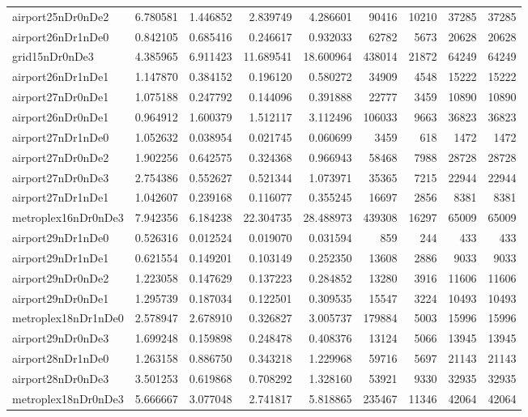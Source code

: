 \begin{longtable}{|l|r|r|r|r|r|r|r|r|}
airport25nDr0nDe2 & 6.780581 & 1.446852 & 2.839749 & 4.286601 & 90416 & 10210 & 37285 & 37285 \\
airport26nDr1nDe0 & 0.842105 & 0.685416 & 0.246617 & 0.932033 & 62782 & 5673 & 20628 & 20628 \\
grid15nDr0nDe3 & 4.385965 & 6.911423 & 11.689541 & 18.600964 & 438014 & 21872 & 64249 & 64249 \\
airport26nDr1nDe1 & 1.147870 & 0.384152 & 0.196120 & 0.580272 & 34909 & 4548 & 15222 & 15222 \\
airport27nDr0nDe1 & 1.075188 & 0.247792 & 0.144096 & 0.391888 & 22777 & 3459 & 10890 & 10890 \\
airport26nDr0nDe1 & 0.964912 & 1.600379 & 1.512117 & 3.112496 & 106033 & 9663 & 36823 & 36823 \\
airport27nDr1nDe0 & 1.052632 & 0.038954 & 0.021745 & 0.060699 & 3459 & 618 & 1472 & 1472 \\
airport27nDr0nDe2 & 1.902256 & 0.642575 & 0.324368 & 0.966943 & 58468 & 7988 & 28728 & 28728 \\
airport27nDr0nDe3 & 2.754386 & 0.552627 & 0.521344 & 1.073971 & 35365 & 7215 & 22944 & 22944 \\
airport27nDr1nDe1 & 1.042607 & 0.239168 & 0.116077 & 0.355245 & 16697 & 2856 & 8381 & 8381 \\
metroplex16nDr0nDe3 & 7.942356 & 6.184238 & 22.304735 & 28.488973 & 439308 & 16297 & 65009 & 65009 \\
airport29nDr1nDe0 & 0.526316 & 0.012524 & 0.019070 & 0.031594 & 859 & 244 & 433 & 433 \\
airport29nDr1nDe1 & 0.621554 & 0.149201 & 0.103149 & 0.252350 & 13608 & 2886 & 9033 & 9033 \\
airport29nDr0nDe2 & 1.223058 & 0.147629 & 0.137223 & 0.284852 & 13280 & 3916 & 11606 & 11606 \\
airport29nDr0nDe1 & 1.295739 & 0.187034 & 0.122501 & 0.309535 & 15547 & 3224 & 10493 & 10493 \\
metroplex18nDr1nDe0 & 2.578947 & 2.678910 & 0.326827 & 3.005737 & 179884 & 5003 & 15996 & 15996 \\
airport29nDr0nDe3 & 1.699248 & 0.159898 & 0.248478 & 0.408376 & 13124 & 5066 & 13945 & 13945 \\
airport28nDr1nDe0 & 1.263158 & 0.886750 & 0.343218 & 1.229968 & 59716 & 5697 & 21143 & 21143 \\
airport28nDr0nDe3 & 3.501253 & 0.619868 & 0.708292 & 1.328160 & 53921 & 9330 & 32935 & 32935 \\
metroplex18nDr0nDe3 & 5.666667 & 3.077048 & 2.741817 & 5.818865 & 235467 & 11346 & 42064 & 42064 \\

\end{longtable}
